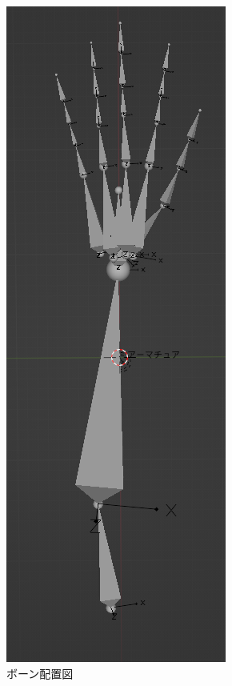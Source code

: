\documentclass{ltjsreport}
\begin{document}
\begin{figure}[H]
\begin{minipage}{0.15\columnwidth}
		\end{minipage}
		\hspace{0.04\columnwidth}
		\begin{minipage}{0.15\columnwidth}
		\centering
		\includegraphics[width = \columnwidth]{../figs/handboneLatAll.png}
		\end{minipage}
		\caption{ボーン配置図}
		\label{fig:bone}
		\end{figure}
\end{document}
